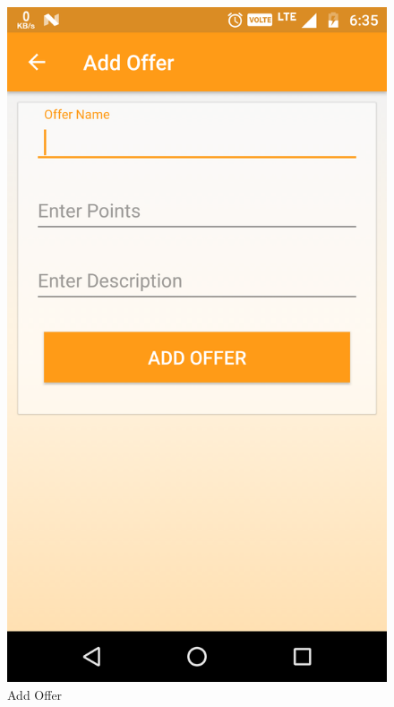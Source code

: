 \\
\begin{figure}[h]
	\centering
	\includegraphics[width=0.7\linewidth]{AddOffer}
	\caption{Add Offer}
\end{figure}
\pagebreak

